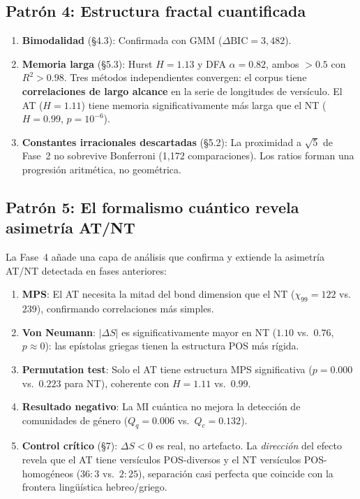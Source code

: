 \documentclass[12pt,a4paper]{article}
\begin{document}
\subsection{Patr\'on 4: Estructura fractal cuantificada}

\begin{enumerate}[leftmargin=2em]
\item \textbf{Bimodalidad} (\S4.3): Confirmada con GMM ($\Delta\text{BIC} = 3{,}482$).

\item \textbf{Memoria larga} (\S5.3): Hurst $H = 1.13$ y DFA $\alpha = 0.82$,
      ambos $> 0.5$ con $R^2 > 0.98$. Tres m\'etodos independientes convergen:
      el corpus tiene \textbf{correlaciones de largo alcance} en la serie de longitudes
      de vers\'iculo. El AT ($H = 1.11$) tiene memoria significativamente m\'as larga
      que el NT ($H = 0.99$, $p = 10^{-6}$).

\item \textbf{Constantes irracionales descartadas} (\S5.2): La proximidad a $\sqrt{5}$
      de Fase~2 no sobrevive Bonferroni (1,172 comparaciones). Los ratios forman
      una progresi\'on aritm\'etica, no geom\'etrica.
\end{enumerate}

\subsection{Patr\'on 5: El formalismo cu\'antico revela asimetr\'ia AT/NT}

La Fase~4 a\~nade una capa de an\'alisis que confirma y extiende la asimetr\'ia
AT/NT detectada en fases anteriores:

\begin{enumerate}[leftmargin=2em]
\item \textbf{MPS}: El AT necesita la mitad del bond dimension que el NT
      ($\chi_{99} = 122$ vs.\ $239$), confirmando correlaciones m\'as simples.
\item \textbf{Von Neumann}: $|\Delta S|$ es significativamente mayor en NT ($1.10$ vs.\ $0.76$,
      $p \approx 0$): las ep\'istolas griegas tienen la estructura POS m\'as r\'igida.
\item \textbf{Permutation test}: Solo el AT tiene estructura MPS significativa
      ($p = 0.000$ vs.\ $0.223$ para NT), coherente con $H = 1.11$ vs.\ $0.99$.
\item \textbf{Resultado negativo}: La MI cu\'antica no mejora la detecci\'on de
      comunidades de g\'enero ($Q_q = 0.006$ vs.\ $Q_c = 0.132$).
\item \textbf{Control cr\'itico} (\S7): $\Delta S < 0$ es real, no artefacto.
      La \emph{direcci\'on} del efecto revela que el AT tiene vers\'iculos POS-diversos
      y el NT vers\'iculos POS-homog\'eneos ($36{:}3$ vs.\ $2{:}25$), separaci\'on
      casi perfecta que coincide con la frontera ling\"u\'istica hebreo/griego.
\end{enumerate}
\end{document}
